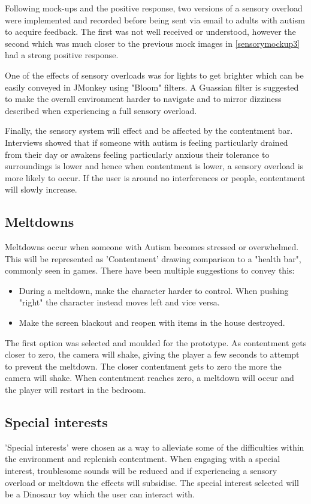 \documentclass[11pt]{report}
\begin{document}
Following mock-ups and the positive response, two versions of a sensory overload were implemented and recorded before being sent via email to adults with autism to acquire feedback. The first was not well received or understood, however the second which was much closer to the previous mock images in \ref{sensorymockup3} had a strong positive response.  

One of the effects of sensory overloads was for lights to get brighter which can be easily conveyed in JMonkey using "Bloom" filters. A Guassian filter is suggested to make the overall environment harder to navigate and to mirror dizziness described when experiencing a full sensory overload. 

Finally, the sensory system will effect and be affected by the contentment bar. Interviews showed that if someone with autism is feeling particularly drained from their day or awakens feeling particularly anxious their tolerance to surroundings is lower and hence when contentment is lower, a sensory overload is more likely to occur. If the user is around no interferences or people, contentment will slowly increase. 

\subsection{Meltdowns}
Meltdowns occur when someone with Autism becomes stressed or overwhelmed. This will be represented as 'Contentment' drawing comparison to a "health bar", commonly seen in games. There have been multiple suggestions to convey this:

\begin{itemize}
\item During a meltdown, make the character harder to control. When pushing "right" the character instead moves left and vice versa.
\item Make the screen blackout and reopen with items in the house destroyed.
\end{itemize}

The first option was selected and moulded for the prototype. As contentment gets closer to zero, the camera will shake, giving the player a few seconds to attempt to prevent the meltdown. The closer contentment gets to zero the more the camera will shake. When contentment reaches zero, a meltdown will occur and the player will restart in the bedroom. 

\subsection{Special interests}
'Special interests' were chosen as a way to alleviate some of the difficulties within the environment and replenish contentment. When engaging with a special interest, troublesome sounds will be reduced and if experiencing a sensory overload or meltdown the effects will subsidise. The special interest selected will be a Dinosaur toy which the user can interact with.
\end{document}
